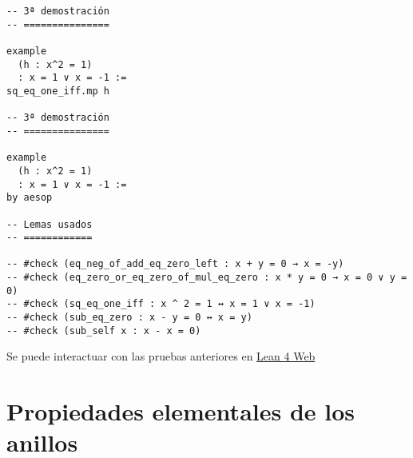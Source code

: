 \begin{verbatim}
-- 3ª demostración
-- ===============

example
  (h : x^2 = 1)
  : x = 1 ∨ x = -1 :=
sq_eq_one_iff.mp h

-- 3ª demostración
-- ===============

example
  (h : x^2 = 1)
  : x = 1 ∨ x = -1 :=
by aesop

-- Lemas usados
-- ============

-- #check (eq_neg_of_add_eq_zero_left : x + y = 0 → x = -y)
-- #check (eq_zero_or_eq_zero_of_mul_eq_zero : x * y = 0 → x = 0 ∨ y = 0)
-- #check (sq_eq_one_iff : x ^ 2 = 1 ↔ x = 1 ∨ x = -1)
-- #check (sub_eq_zero : x - y = 0 ↔ x = y)
-- #check (sub_self x : x - x = 0)
\end{verbatim}
Se puede interactuar con las pruebas anteriores en \href{https://lean.math.hhu.de/\#url=https://raw.githubusercontent.com/jaalonso/Calculemus2/main/src/Cuadrado\_igual\_a\_uno.lean.lean}{Lean 4 Web}

\chapter{Propiedades elementales de los anillos}
\label{sec:orgd7fa367}

